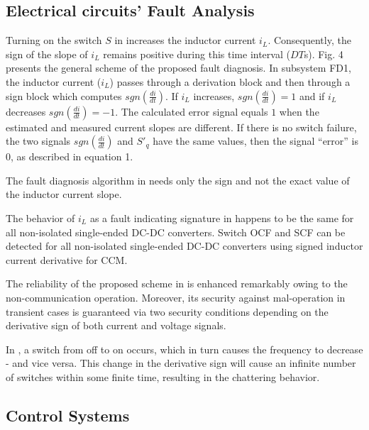 \documentclass[11pt]{book}
\begin{document}

\subsection{Electrical circuits' Fault Analysis}

Turning on the switch $S$ in \cite{shahbazi2012open} increases the
inductor current $i_{L}$. Consequently, the sign of the slope of
$i_{L}$ remains positive during this time interval ($DT$s). Fig.
4 presents the general scheme of the proposed fault diagnosis. In
subsystem FD1, the inductor current ($i_{L}$) passes through a derivation
block and then through a sign block which computes $sgn\left(\frac{di}{dt}\right)$.
If $i_{L}$ increases, $sgn\left(\frac{di}{dt}\right)=1$ and if $i_{L}$
decreases $sgn\left(\frac{di}{dt}\right)=-1$. The calculated error
signal equals $1$ when the estimated and measured current slopes
are different. If there is no switch failure, the two signals $sgn\left(\frac{di}{dt}\right)$
and $S'_{q}$ have the same values, then the signal ``error'' is
$0$, as described in equation 1.

The fault diagnosis algorithm in \cite{jamshidpour2015photovoltaic}
needs only the sign and not the exact value of the inductor current
slope.

The behavior of $i_{L}$ as a fault indicating signature in \cite{bento2018comprehensive}
happens to be the same for all non-isolated single-ended DC-DC converters.
Switch OCF and SCF can be detected for all non-isolated single-ended
DC-DC converters using signed inductor current derivative for CCM.

The reliability of the proposed scheme in \cite{elgeziry2019non}
is enhanced remarkably owing to the non-communication operation. Moreover,
its security against mal-operation in transient cases is guaranteed
via two security conditions depending on the derivative sign of both
current and voltage signals.

In \cite{kasis2021primary}, a switch from off to on occurs, which
in turn causes the frequency to decrease - and vice versa. This change
in the derivative sign will cause an infinite number of switches within
some finite time, resulting in the chattering behavior.


\subsection{Control Systems}
\end{document}
